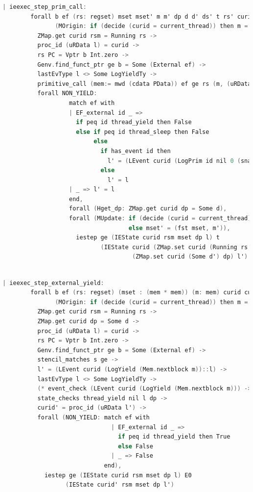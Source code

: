 \begin{lstlisting}[language=C]
    | ieexec_step_prim_call:
        forall b ef (rs: regset) mset mset' m m' dp d d' ds' t rs' curid rsm l l'
               (MOrigin: if (decide (curid = current_thread)) then m = fst mset else m = snd mset),
          ZMap.get curid rsm = Running rs ->
          proc_id (uRData l) = curid ->
          rs PC = Vptr b Int.zero ->
          Genv.find_funct_ptr ge b = Some (External ef) ->
          lastEvType l <> Some LogYieldTy ->
          primitive_call (mem:= mwd (cdata PData)) ef ge rs (m, (uRData l, d)) t rs' (m', (ds', d')) ->
          forall NON_YIELD: 
                   match ef with
                   | EF_external id _ => 
                     if peq id thread_yield then False
                     else if peq id thread_sleep then False
                          else
                            if has_event id then
                              l' = (LEvent curid (LogPrim id nil 0 (snap_func d)) :: l)
                            else
                              l' = l
                   | _ => l' = l
                   end,
                   forall (Hget_dp: ZMap.get curid dp = Some d),
                   forall (MUpdate: if (decide (curid = current_thread)) then mset' = (m', snd mset)
                                    else mset' = (fst mset, m')),
                     iestep ge (IEState curid rsm mset dp l) t 
                            (IEState curid (ZMap.set curid (Running rs') rsm) mset' 
                                     (ZMap.set curid (Some d') dp) l')
                            
\end{lstlisting}

\begin{lstlisting}[language=C]
    | ieexec_step_external_yield:
        forall b ef (rs: regset) (mset : (mem * mem)) (m: mem) curid curid' rsm s l l' dp d
               (MOrigin: if (decide (curid = current_thread)) then m = fst mset else m = snd mset),
          ZMap.get curid rsm = Running rs ->
          ZMap.get curid dp = Some d ->
          proc_id (uRData l) = curid ->
          rs PC = Vptr b Int.zero ->
          Genv.find_funct_ptr ge b = Some (External ef) ->
          stencil_matches s ge ->
          l' = (LEvent curid (LogYield (Mem.nextblock m))::l) ->
          lastEvType l <> Some LogYieldTy ->
          (* event_check (LEvent curid (LogYield (Mem.nextblock m))) -> *)
          state_checks thread_yield nil l dp ->
          curid' = proc_id (uRData l') ->
          forall (NON_YIELD: match ef with
                               | EF_external id _ => 
                                 if peq id thread_yield then True
                                 else False
                               | _ => False
                             end),
            iestep ge (IEState curid rsm mset dp l) E0
                  (IEState curid' rsm mset dp l')

\end{lstlisting}

